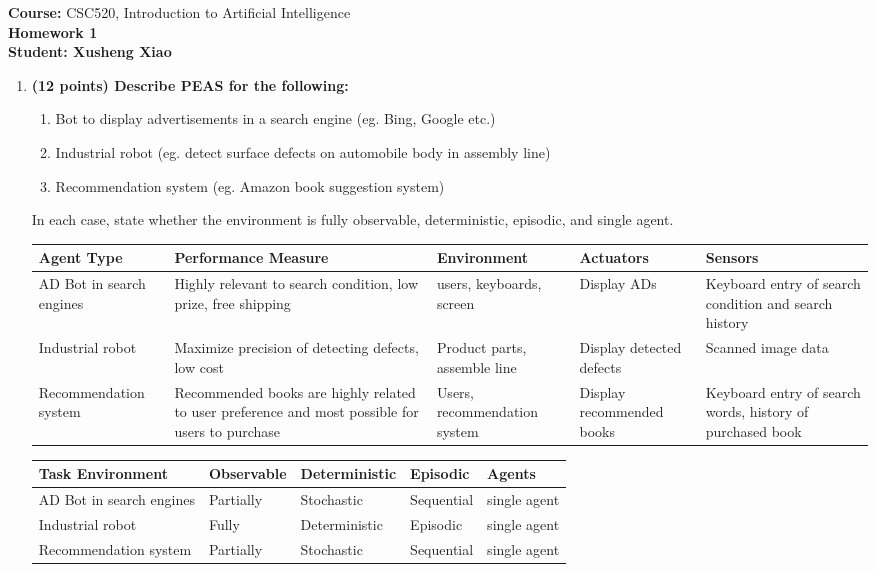 \documentclass{article}%
\begin{document}
\begin{flushleft}
\textbf{Course:} CSC520, Introduction to Artificial Intelligence\\
\textbf{Homework 1}\\
\textbf{Student: Xusheng Xiao}
\end{flushleft}

\noindent{\hrulefill}

\bigskip

\begin{enumerate}
	\item \textbf{ (12 points) Describe PEAS for the following:}
	\begin{enumerate}
	\item Bot to display advertisements in a search engine (eg. Bing, Google etc.)
	\item Industrial robot (eg. detect surface defects on automobile body in assembly line)
	\item Recommendation system (eg. Amazon book suggestion system)
	\end{enumerate}
     
     In each case, state whether the environment is fully observable, deterministic, episodic, and single agent. \\
     

	\begin{tabular}{|p{2.5cm}|p{2.5cm}|p{2.5cm}|p{2cm}|p{2cm}|}
	\hline  \textbf{Agent Type} &  \textbf{Performance Measure }&  \textbf{Environment }& \textbf{Actuators }& \textbf{Sensors}  \\ 
	\hline  AD Bot in search engines &  Highly relevant to search condition, low prize, free shipping &  users, keyboards,  screen & Display ADs  & Keyboard entry of search condition and search history\\ 
	\hline  Industrial robot  & Maximize precision of detecting defects, low cost & Product parts, assemble line & Display detected defects & Scanned image data \\ 
	\hline  Recommendation system &  Recommended books are highly related to user preference and most possible for users to purchase  &  Users, recommendation system & Display recommended books  &Keyboard entry of search words, history of purchased book\\ 
	\hline 
	\end{tabular} 
	
	\begin{tabular}{|p{2.5cm}|p{2.5cm}|p{2.5cm}|p{2cm}|p{2cm}|}
	\hline  \textbf{Task Environment} &  \textbf{Observable}&  \textbf{Deterministic }& \textbf{Episodic }& \textbf{Agents}  \\ 
	\hline  AD Bot in search engines &  Partially &  Stochastic & Sequential  & single agent\\ 
	\hline  Industrial robot  & Fully & Deterministic & Episodic & single agent \\ 
	\hline  Recommendation system &  Partially  &  Stochastic & Sequential  &single agent\\ 
	\hline 
	\end{tabular} 




\end{enumerate}
\end{document}
